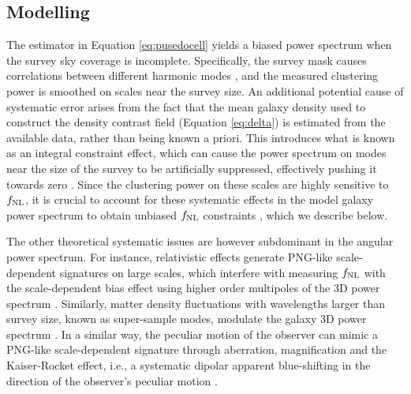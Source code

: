 \subsection{Modelling}
The estimator in Equation \ref{eq:pusedocell} yields a biased power spectrum when the survey sky coverage is incomplete. Specifically, the survey mask causes correlations between different harmonic modes \citep{beutler2014clustering,wilson2017rapid}, and the measured clustering power is smoothed on scales near the survey size. An additional potential cause of systematic error arises from the fact that the mean galaxy density used to construct the density contrast field (Equation \ref{eq:delta}) is estimated from the available data, rather than being known a priori. This introduces what is known as an integral constraint effect, which can cause the power spectrum on modes near the size of the survey to be artificially suppressed, effectively pushing it towards zero \citep{peacock1991large,de2019integral}. Since the clustering power on these scales are highly sensitive to $f_{\rm NL}$, it is crucial to account for these systematic effects in the model galaxy power spectrum to obtain unbiased $f_{\rm NL}$ constraints \citep[see, also,][]{riquelme2022primordial}, which we describe below.
  
The other theoretical systematic issues are however subdominant in the angular power spectrum. For instance, relativistic effects generate PNG-like scale-dependent signatures on large scales, which interfere with measuring $f_{\rm NL}$ with the scale-dependent bias effect using higher order multipoles of the 3D power spectrum \citep{wang2020}. Similarly, matter density fluctuations with wavelengths larger than survey size, known as super-sample modes, modulate the galaxy 3D power spectrum \citep{castorina2020JCAP}. In a similar way, the peculiar motion of the observer can mimic a PNG-like scale-dependent signature through aberration, magnification and the Kaiser-Rocket effect, i.e., a systematic dipolar apparent blue-shifting in the direction of the observer's peculiar motion \citep{2021JCAP...11..027B}.
  
